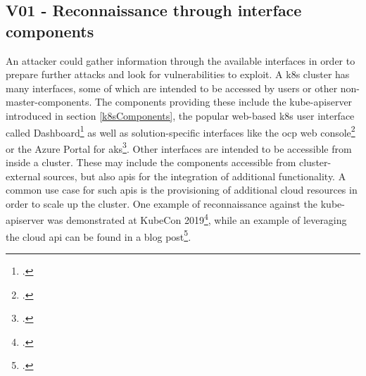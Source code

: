 \subsection{V01 - Reconnaissance through interface components} \label{v01}
An attacker could gather information through the available interfaces in order to prepare further attacks and look for vulnerabilities to exploit.
A \gls{k8s} cluster has many interfaces, some of which are intended to be accessed by users or other non-master-components. The components providing these include the kube-apiserver introduced in section \ref{k8sComponents}, the popular web-based \gls{k8s} user interface called Dashboard\footcite[][, first paragraph]{k8sDashboard} as well as solution-specific interfaces like the \gls{ocp} web console\footcite[][, section 'Overview']{ocpWebConsole} or the Azure Portal for \gls{aks}\footcite[][, section 'Create an AKS cluster']{azurePortal}.
Other interfaces are intended to be accessible from inside a cluster. These may include the components accessible from cluster-external sources, but also \gls{api}s for the integration of additional functionality. A common use case for such \gls{api}s is the provisioning of additional cloud resources in order to scale up the cluster.
One example of reconnaissance against the kube-apiserver was demonstrated at KubeCon 2019\footcite[][, starting at 8:45]{lizReconDemo}, while an example of leveraging the cloud api can be found in a blog post\footcite{aksApiExploit}.

